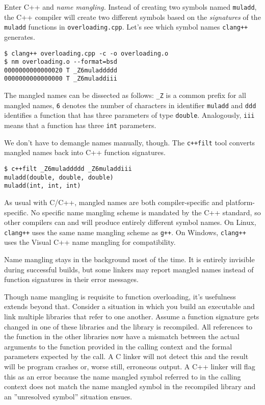 \documentclass[12pt,a4paper]{article}
\newcommand{\C}{C}
\newcommand{\Cpp}{C++}
\newcommand{\CCpp}{\C/\Cpp}
\newcommand{\gXX}{\texttt{g++}}
\newcommand{\clangXX}{\texttt{clang++}}
\newcommand{\Cppfilt}{\texttt{c++filt}}
\newcommand{\labelname}[1]{\texttt{#1}}
\newcommand{\functionname}[1]{\labelname{#1}}
\newcommand{\filename}[1]{\texttt{#1}}
\begin{document}


Enter \Cpp{} and \emph{name mangling.} Instead of creating two symbols named \labelname{muladd}, the \Cpp{} compiler will create two different symbols based on the \emph{signatures} of the \labelname{muladd} functions in \filename{overloading.cpp}. Let's see which symbol names \clangXX{} generates.\\

\begin{lstlisting}[caption=mangled names]
$ clang++ overloading.cpp -c -o overloading.o
$ nm overloading.o --format=bsd
0000000000000020 T _Z6muladdddd
0000000000000000 T _Z6muladdiii
\end{lstlisting}

The mangled names can be dissected as follows: \texttt{\_Z} is a common prefix for all mangled names, \texttt{6} denotes the number of characters in identifier \functionname{muladd} and \texttt{ddd} identifies a function that has three parameters of type \texttt{double}. Analogously, \texttt{iii} means that a function has three \texttt{int} parameters.

We don't have to demangle names manually, though. The \Cppfilt{} tool converts mangled names back into \Cpp{} function signatures.\\

\begin{lstlisting}[caption=using \Cppfilt{}]
$ c++filt _Z6muladdddd _Z6muladdiii
muladd(double, double, double)
muladd(int, int, int)
\end{lstlisting}

As usual with \CCpp{}, mangled names are both compiler-specific and platform-specific. No specific name mangling scheme is mandated by the \Cpp{} standard, so other compilers can and will produce entirely different symbol names. On Linux, \clangXX{} uses the same name mangling scheme as \gXX{}. On Windows, \clangXX{} uses the Visual \Cpp{} name mangling for compatibility.

Name mangling stays in the background most of the time. It is entirely invisible during successful builds, but some linkers may report mangled names instead of function signatures in their error messages.

Though name mangling is requisite to function overloading, it's usefulness extends beyond that. Consider a situation in which you build an executable and link multiple libraries that refer to one another. Assume a function signature gets changed in one of these libraries and the library is recompiled. All references to the function in the other libraries now have a mismatch between the actual arguments to the function provided in the calling context and the formal parameters expected by the call. A \C{} linker will not detect this and the result will be program crashes or, worse still, erroneous output. A \Cpp{} linker will flag this as an error because the name mangled symbol referred to in the calling context does not match the name mangled symbol in the recompiled library and an ''unresolved symbol'' situation ensues.
\end{document}
